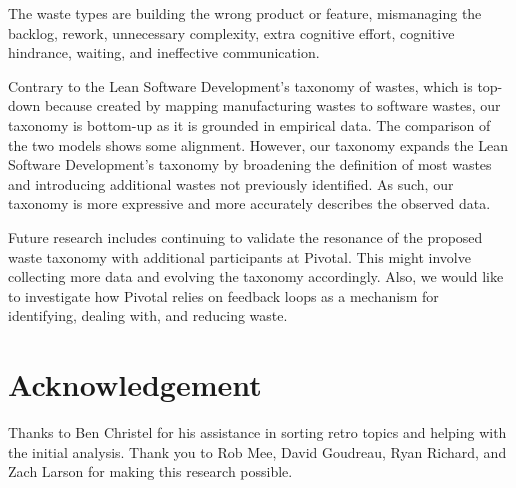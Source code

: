 The waste types are building the wrong product or feature, mismanaging the backlog, rework, unnecessary complexity, extra cognitive effort, cognitive hindrance, waiting, and ineffective communication.


Contrary to the Lean Software Development's taxonomy of wastes, which is top-down because created by mapping manufacturing wastes to software wastes, our taxonomy is bottom-up as it is grounded in empirical data. The comparison of the two models shows some alignment. However, our taxonomy expands the Lean Software Development's taxonomy by broadening the definition of most wastes and introducing additional wastes not previously identified. As such, our taxonomy is more expressive and more accurately describes the observed data.


Future research includes continuing to validate the resonance of the proposed waste taxonomy with additional participants at Pivotal. This might involve collecting more data and evolving the taxonomy accordingly. Also, we would like to investigate how Pivotal relies on feedback loops as a mechanism for identifying, dealing with, and reducing waste. 











\section*{Acknowledgement}
Thanks to Ben Christel for his assistance in sorting retro topics and helping with the initial analysis. Thank you to Rob Mee, David Goudreau, Ryan Richard, and Zach Larson for making this research possible.




